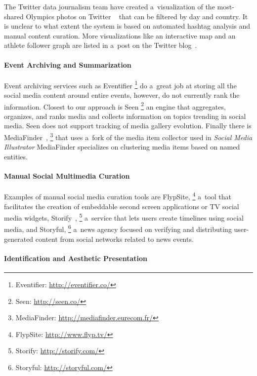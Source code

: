 \documentclass{sig-alternate}
\newcommand{\inlinelistingsize}{\fontsize{8pt}{11pt}}
\let\oldurl\url
\renewcommand{\url}[1]{\inlinelistingsize\oldurl{#1}}
\begin{document}
The Twitter data journalism team have created a~visualization
of the most-shared Olympics photos on Twitter%
~\cite{schweitzer2014twitter} that can be
filtered by day and country.
It is unclear to what extent the system is based
on automated hashtag analysis and manual content curation.
More visualizations like an interactive map
and an athlete follower graph
are listed in a~post on the Twitter blog~\cite{rogers2014twitter}.

\paragraph{Event Archiving and Summarization}

Event archiving services such as Eventifier%
\footnote{Eventifier: \url{http://eventifier.co/}} 
do a~great job at storing all the social media content around
entire events, however, do not currently rank the information.
Closest to our approach is Seen%
\footnote{Seen: \url{http://seen.co/}}
an engine that aggregates, organizes, and ranks media
and collects information on topics trending in social media.
Seen does not support tracking of media gallery evolution.
Finally there is MediaFinder~\cite{troncy2013mediafinder},%
\footnote{MediaFinder: \url{http://mediafinder.eurecom.fr/}}
that uses a~fork of the media item collector
used in \emph{Social Media Illustrator}
MediaFinder specializes on clustering media items
based on named entities.

\paragraph{Manual Social Multimedia Curation}

Examples of manual social media curation tools are FlypSite,%
\footnote{FlypSite: \url{http://www.flyp.tv/}}
a~tool that facilitates the creation of embeddable
second screen applications or TV social media widgets,
Storify~\cite{fincham2011storify,atasoy2011storify},%
\footnote{Storify: \url{http://storify.com/}}
a~service that lets users create
timelines using social media, and Storyful,%
\footnote{Storyful: \url{http://storyful.com/}}
a~news agency focused on verifying and distributing
user-generated content from social networks related to news events.

\paragraph{Identification and Aesthetic Presentation}
\end{document}
